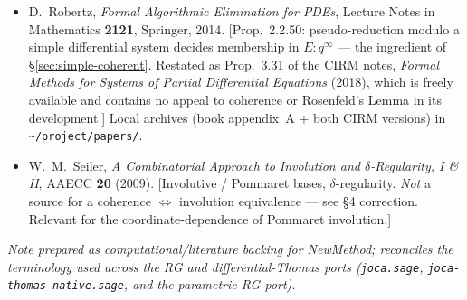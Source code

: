 \documentclass[11pt]{article}
\newcommand{\code}[1]{\texttt{#1}}
\begin{document}
\begin{itemize}
        Lemma). The system-level phrasing of coherence used in
        \S\ref{sec:simple-coherent}.] Local archive:
        \nolinkurl{~/project/papers/boulier-lazard-ollivier-petitot-2009-radical-differential-ideal.pdf}.
  \item D.~Robertz, \emph{Formal Algorithmic Elimination for PDEs}, Lecture
        Notes in Mathematics \textbf{2121}, Springer, 2014. [Prop.~2.2.50:
        pseudo-reduction modulo a simple differential system decides membership
        in $E:q^\infty$ --- the ingredient of \S\ref{sec:simple-coherent}.
        Restated as Prop.~3.31 of the CIRM notes, \emph{Formal Methods for
        Systems of Partial Differential Equations} (2018), which is freely
        available and contains no appeal to coherence or Rosenfeld's Lemma in
        its development.] Local archives (book appendix~A + both CIRM versions)
        in \nolinkurl{~/project/papers/}.
  \item W.~M.~Seiler, \emph{A Combinatorial Approach to Involution and
        $\delta$-Regularity, I \& II}, AAECC \textbf{20} (2009). [Involutive /
        Pommaret bases, $\delta$-regularity. \emph{Not} a source for a
        coherence $\Leftrightarrow$ involution equivalence --- see \S4
        correction. Relevant for the coordinate-dependence of Pommaret
        involution.]
\end{itemize}

\bigskip
\noindent\emph{Note prepared as computational/literature backing for
NewMethod; reconciles the terminology used across the RG and differential-Thomas
ports (\code{joca.sage}, \code{joca-thomas-native.sage}, and the parametric-RG
port).}
\end{document}
